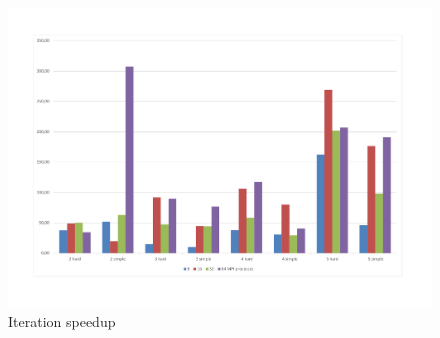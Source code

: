 \documentclass[runningheads]{llncs}
\begin{document}



\begin{figure} 
	\begin{center} 
		\begin{minipage}[h]{0.9\linewidth} 
			\includegraphics[width=1\linewidth]{figure/fig6.pdf} 
			\caption{Iteration speedup} %
			\label{fig:fig4} 
		\end{minipage} 
	\end{center} 
\end{figure}	
\end{document}
